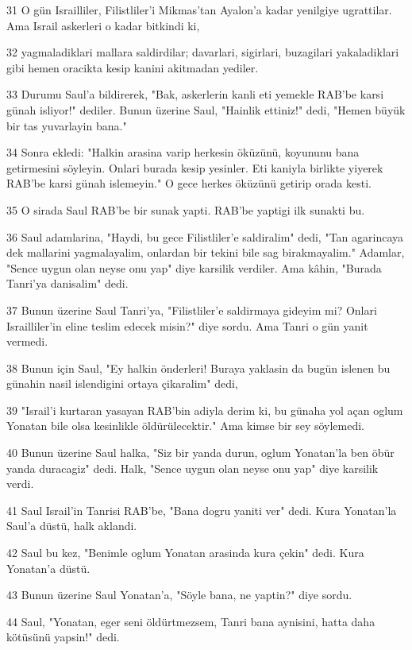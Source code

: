 \par 31 O gün Israilliler, Filistliler'i Mikmas'tan Ayalon'a kadar yenilgiye ugrattilar. Ama Israil askerleri o kadar bitkindi ki,
\par 32 yagmaladiklari mallara saldirdilar; davarlari, sigirlari, buzagilari yakaladiklari gibi hemen oracikta kesip kanini akitmadan yediler.
\par 33 Durumu Saul'a bildirerek, "Bak, askerlerin kanli eti yemekle RAB'be karsi günah isliyor!" dediler. Bunun üzerine Saul, "Hainlik ettiniz!" dedi, "Hemen büyük bir tas yuvarlayin bana."
\par 34 Sonra ekledi: "Halkin arasina varip herkesin öküzünü, koyununu bana getirmesini söyleyin. Onlari burada kesip yesinler. Eti kaniyla birlikte yiyerek RAB'be karsi günah islemeyin." O gece herkes öküzünü getirip orada kesti.
\par 35 O sirada Saul RAB'be bir sunak yapti. RAB'be yaptigi ilk sunakti bu.
\par 36 Saul adamlarina, "Haydi, bu gece Filistliler'e saldiralim" dedi, "Tan agarincaya dek mallarini yagmalayalim, onlardan bir tekini bile sag birakmayalim." Adamlar, "Sence uygun olan neyse onu yap" diye karsilik verdiler. Ama kâhin, "Burada Tanri'ya danisalim" dedi.
\par 37 Bunun üzerine Saul Tanri'ya, "Filistliler'e saldirmaya gideyim mi? Onlari Israilliler'in eline teslim edecek misin?" diye sordu. Ama Tanri o gün yanit vermedi.
\par 38 Bunun için Saul, "Ey halkin önderleri! Buraya yaklasin da bugün islenen bu günahin nasil islendigini ortaya çikaralim" dedi,
\par 39 "Israil'i kurtaran yasayan RAB'bin adiyla derim ki, bu günaha yol açan oglum Yonatan bile olsa kesinlikle öldürülecektir." Ama kimse bir sey söylemedi.
\par 40 Bunun üzerine Saul halka, "Siz bir yanda durun, oglum Yonatan'la ben öbür yanda duracagiz" dedi. Halk, "Sence uygun olan neyse onu yap" diye karsilik verdi.
\par 41 Saul Israil'in Tanrisi RAB'be, "Bana dogru yaniti ver" dedi. Kura Yonatan'la Saul'a düstü, halk aklandi.
\par 42 Saul bu kez, "Benimle oglum Yonatan arasinda kura çekin" dedi. Kura Yonatan'a düstü.
\par 43 Bunun üzerine Saul Yonatan'a, "Söyle bana, ne yaptin?" diye sordu.
\par 44 Saul, "Yonatan, eger seni öldürtmezsem, Tanri bana aynisini, hatta daha kötüsünü yapsin!" dedi.
